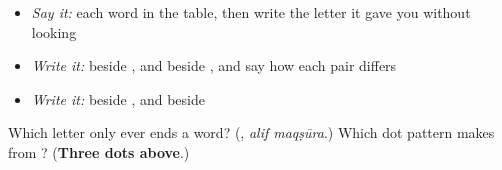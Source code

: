 \begin{itemize}
\raggedright
  \item \emph{Say it:} each word in the table, then write the letter it gave you without looking
  \item \emph{Write it:}  beside , and  beside , and say how each pair differs
  \item \emph{Write it:}  beside , and  beside 
\end{itemize}

\begin{tcolorbox}[breakable,colback=teal!4,colframe=teal!35!black,title={Before you move on}]
Which letter only ever ends a word? (\textbf{}, \emph{alif maqṣūra}.) Which dot pattern makes  from ? (\textbf{Three dots above}.)
\end{tcolorbox}
